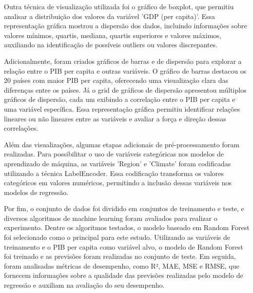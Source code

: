 \documentclass[conference]{IEEEtran}
\begin{document}
Outra técnica de visualização utilizada foi o gráfico de boxplot, que permitiu analisar a distribuição dos valores da variável 'GDP (per capita)'. Essa representação gráfica mostrou a dispersão dos dados, incluindo informações sobre valores mínimos, quartis, mediana, quartis superiores e valores máximos, auxiliando na identificação de possíveis outliers ou valores discrepantes.

Adicionalmente, foram criados gráficos de barras e de dispersão para explorar a relação entre o PIB per capita e outras variáveis. O gráfico de barras destacou os 20 países com maior PIB per capita, oferecendo uma visualização clara das diferenças entre os países. Já o grid de gráficos de dispersão apresentou múltiplos gráficos de dispersão, cada um exibindo a correlação entre o PIB per capita e uma variável específica. Essa representação gráfica permitiu identificar relações lineares ou não lineares entre as variáveis e avaliar a força e direção dessas correlações.

\begin{figure}[htbp]
  \centering
  \begin{floatrow}
  \end{floatrow}
\end{figure}

Além das visualizações, algumas etapas adicionais de pré-processamento foram realizadas. Para possibilitar o uso de variáveis categóricas nos modelos de aprendizado de máquina, as variáveis 'Region' e 'Climate' foram codificadas utilizando a técnica LabelEncoder. Essa codificação transforma os valores categóricos em valores numéricos, permitindo a inclusão dessas variáveis nos modelos de regressão.

Por fim, o conjunto de dados foi dividido em conjuntos de treinamento e teste, e diversos algoritmos de machine learning foram avaliados para realizar o experimento. Dentre os algoritmos testados, o modelo baseado em Random Forest foi selecionado como o principal para este estudo. Utilizando as variáveis de treinamento e o PIB per capita como variável alvo, o modelo de Random Forest foi treinado e as previsões foram realizadas no conjunto de teste. Em seguida, foram analisadas métricas de desempenho, como R², MAE, MSE e RMSE, que fornecem informações sobre a qualidade das previsões realizadas pelo modelo de regressão e auxiliam na avaliação do seu desempenho.
\end{document}
